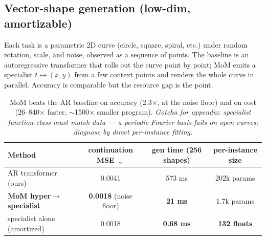\documentclass[11pt]{article}
\begin{document}
\subsection{Vector-shape generation (low-dim, amortizable)}
Each task is a parametric 2D curve (circle, square, spiral, etc.) under random
rotation, scale, and noise, observed as a sequence of points. The baseline is an
autoregressive transformer that rolls out the curve point by point; MoM emits a
specialist $t\mapsto(x,y)$ from a few context points and renders the whole curve in
parallel. Accuracy is comparable but the resource gap is the point.
\begin{table}[h]\centering\small
\begin{tabular}{lccc}
\toprule
Method & continuation MSE $\downarrow$ & gen time (256 shapes) & per-instance size \\
\midrule
AR transformer (ours) & 0.0041 & 573 ms & 202k params \\
\textbf{MoM hyper$\to$specialist} & \textbf{0.0018} (noise floor) & \textbf{21 ms} & 1.7k params \\
\quad specialist alone (amortized) & 0.0018 & \textbf{0.68 ms} & \textbf{132 floats} \\
\bottomrule
\end{tabular}
\caption{MoM beats the AR baseline on accuracy (2.3$\times$, at the noise floor) and
on cost (26--840$\times$ faster, $\sim$1500$\times$ smaller program). \emph{Gotcha
for appendix: specialist function-class must match data --- a periodic Fourier basis
fails on open curves; diagnose by direct per-instance fitting.}}
\end{table}
\end{document}
